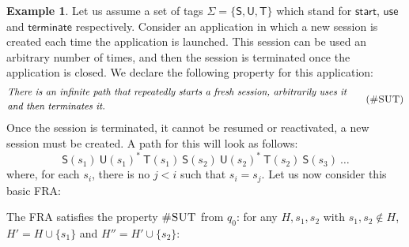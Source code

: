 \documentclass[10pt,a4paper]{article}
\theoremstyle{definition}
\newtheorem{example}[theorem]{Example}
\theoremstyle{remark}
\newcommand\Gfr[1]{#1^\circledast}
\newcommand\nt[1]{{\em\color{blue}#1}}
\newcommand\ntnote[1]{\sidenote{\nt{#1}}}
\renewcommand\ntnote[1]{}
\begin{document}
\ntnote{\scriptsize maybe present properties as above, giving them a name. It would be good to also include a taint example with freshness. Not sure about having FRAs for them as they take some space. If we do include FRAs then better not do Taint}
\begin{example}\label{example:sessions}
Let us assume a set of tags $\Sigma = \{\mathsf{S}, \mathsf{U}, \mathsf{T}\}$ which stand for $\mathsf{start}$, $\mathsf{use}$ and $\mathsf{terminate}$ respectively.
Consider an application in which a new session is created each time the application is launched.
This session can be used an arbitrary number of times, and then the session is terminated once the application is closed. 
We declare the following property for this application:
\[\begin{aligned}
	&\text{\em There is an infinite path that repeatedly starts a fresh session, arbitrarily uses it}\\
	&\text{\em and then terminates it.}
\end{aligned}\tag{\textsc{\#SUT}}\]
Once the session is terminated, it cannot be resumed or reactivated, a new session must be created.
A path for this will look as follows:
\[
	\mathsf{S}(s_1)\ \mathsf{U}(s_1)^*\ \mathsf{T}(s_1)\ \mathsf{S}(s_2)\ \mathsf{U}(s_2)^*\ \mathsf{T}(s_2)\ \mathsf{S}(s_3)\ \dots 
\]
where, for each $s_i$, there is no $j < i$ such that $s_i = s_j$.
Let us now consider this basic FRA:

\begin{centering}
\end{centering}

\noindent
The FRA satisfies the property $\textsc{\#SUT}$ from $q_0$: for any $H, s_1,s_2$ with $s_1,s_2\notin H$, $H'=H\cup\{s_1\}$ and $H'' = H' \cup \{s_2\}$:


\end{example}
\end{document}
